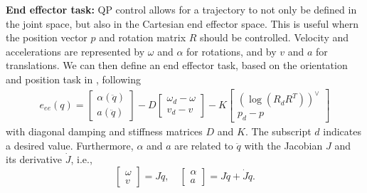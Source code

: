 \documentclass[a4paper, 10pt, conference]{ieeeconf}
\begin{document}
    \textbf{End effector task:}
    QP control allows for a trajectory to not only be defined in the joint space, but also in the Cartesian end effector space. This is useful whern the position vector $p$ and rotation matrix $R$ should be controlled. Velocity and accelerations are represented by $\omega$ and $\alpha$ for rotations, and by $v$ and $a$ for translations. We can then define an end effector task, based on the orientation and position task in \cite{cisnerosRobustHumanoidControl2018}, following 
      \begin{align} \label{eq:eetask} e_{ee}(q) = 
    \begin{bmatrix} \alpha(\ddot{q}) \\ a(\ddot{q}) \end{bmatrix}
    - D \begin{bmatrix} \omega_d - {\omega} \\ v_d - v \end{bmatrix}  - K \begin{bmatrix}(\log({R}_dR^T))^{\vee }  \\p_d - {p}  \end{bmatrix}
        \end{align} with diagonal damping and stiffness matrices $D$ and $K$. The subscript $d$ indicates a desired value. Furthermore, $\alpha$ and $a$ are related to $\ddot{q}$ with the Jacobian $J$ and its derivative $\dot{J}$, i.e.,
    \begin{equation}\label{eq:jacobian}
    \begin{bmatrix} \omega \\ v \end{bmatrix}=J\dot{q},
    \quad 
    \begin{bmatrix} \alpha \\ a \end{bmatrix}=J\ddot{q}+\dot{J}\dot{q}.
    \end{equation}
\end{document}
